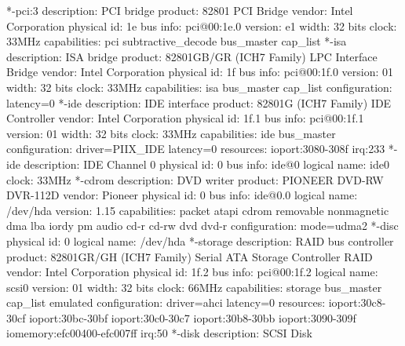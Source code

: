 \documentclass[mingoth,a4paper]{jsarticle}
\begin{document}
{{{{{{{{{{{{{{\begin{commandline}
        *-pci:3
             description: PCI bridge
             product: 82801 PCI Bridge
             vendor: Intel Corporation
             physical id: 1e
             bus info: pci@00:1e.0
             version: e1
             width: 32 bits
             clock: 33MHz
             capabilities: pci subtractive_decode bus_master cap_list
        *-isa
             description: ISA bridge
             product: 82801GB/GR (ICH7 Family) LPC Interface Bridge
             vendor: Intel Corporation
             physical id: 1f
             bus info: pci@00:1f.0
             version: 01
             width: 32 bits
             clock: 33MHz
             capabilities: isa bus_master cap_list
             configuration: latency=0
        *-ide
             description: IDE interface
             product: 82801G (ICH7 Family) IDE Controller
             vendor: Intel Corporation
             physical id: 1f.1
             bus info: pci@00:1f.1
             version: 01
             width: 32 bits
             clock: 33MHz
             capabilities: ide bus_master
             configuration: driver=PIIX_IDE latency=0
             resources: ioport:3080-308f irq:233
           *-ide
                description: IDE Channel 0
                physical id: 0
                bus info: ide@0
                logical name: ide0
                clock: 33MHz
              *-cdrom
                   description: DVD writer
                   product: PIONEER DVD-RW DVR-112D
                   vendor: Pioneer
                   physical id: 0
                   bus info: ide@0.0
                   logical name: /dev/hda
                   version: 1.15
                   capabilities: packet atapi cdrom removable nonmagnetic dma lba iordy pm audio cd-r cd-rw dvd dvd-r
                   configuration: mode=udma2
                 *-disc
                      physical id: 0
                      logical name: /dev/hda
        *-storage
             description: RAID bus controller
             product: 82801GR/GH (ICH7 Family) Serial ATA Storage Controller RAID
             vendor: Intel Corporation
             physical id: 1f.2
             bus info: pci@00:1f.2
             logical name: scsi0
             version: 01
             width: 32 bits
             clock: 66MHz
             capabilities: storage bus_master cap_list emulated
             configuration: driver=ahci latency=0
             resources: ioport:30c8-30cf ioport:30bc-30bf ioport:30c0-30c7 ioport:30b8-30bb ioport:3090-309f iomemory:efc00400-efc007ff irq:50
           *-disk
                description: SCSI Disk

\end{commandline}}}}}}}}}}}}}}}
\end{document}

